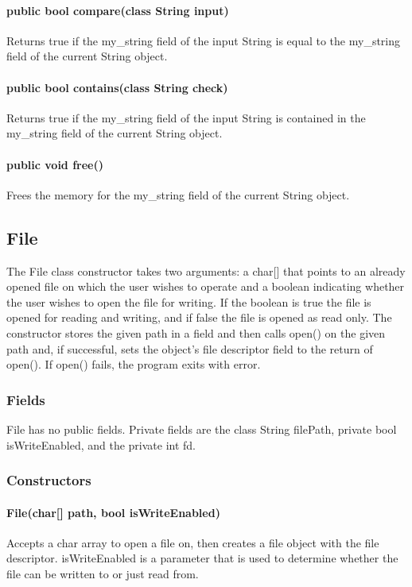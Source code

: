 \begin{homeworkProblem}
	\paragraph{public bool compare(class String input)}
	Returns true if the my\_string field of the input String is equal to the my\_string field of the current String object.
	\paragraph{public bool contains(class String check)}
	Returns true if the my\_string field of the input String is contained in the my\_string field of the current String object.
	\paragraph{public void free()}
	Frees the memory for the my\_string field of the current String object.
	
	\subsection{File}
	The File class constructor takes two arguments: a char[] that points to an already opened file on which the user wishes to operate and a boolean indicating whether the user wishes to open the file for writing. If the boolean is true the file is opened for reading and writing, and if false the file is opened as read only. The constructor stores the given path in a field and then calls open() on the given path and, if successful, sets the object's file descriptor field to the return of open(). If open() fails, the program exits with error.
	\subsubsection{Fields}
	File has no public fields. Private fields are the class String filePath, private bool isWriteEnabled, and the private int fd.
	
	\subsubsection{Constructors}
	\paragraph{File(char[] path, bool isWriteEnabled)}
	Accepts a char array to open a file on, then creates a file object with the file descriptor. isWriteEnabled is a parameter that is used to determine whether the file can be written to or just read from.
	

\end{homeworkProblem}
